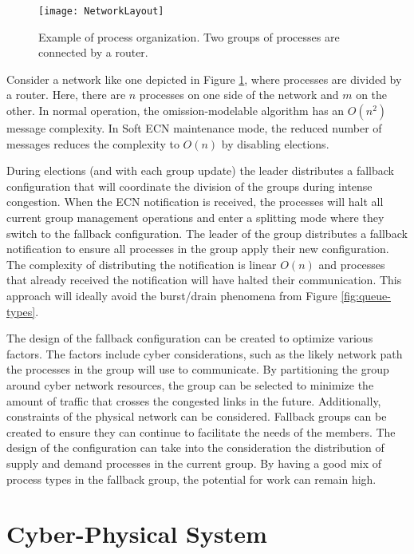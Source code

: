 \begin{figure}
\centering
\texttt{[image: NetworkLayout]}
\caption[Example of process organization]{Example of process organization. Two groups of processes are connected by a router.} \label{fig:network-layout}
\end{figure}

Consider a network like one depicted in Figure \ref{fig:network-layout}, where processes are divided by a router.
Here, there are $n$ processes on one side of the network and $m$ on the other.
In normal operation, the omission-modelable algorithm has an $O(n^2)$ message complexity.
In Soft \ac{ECN} maintenance mode, the reduced number of messages reduces the complexity to $O(n)$ by disabling elections.

During elections (and with each group update) the leader distributes a fallback configuration that will coordinate the division of the groups during intense congestion.
When the \ac{ECN} notification is received, the processes will halt all current group management operations and enter a splitting mode where they switch to the fallback configuration.
The leader of the group distributes a fallback notification to ensure all processes in the group apply their new configuration. 
The complexity of distributing the notification is linear $O(n)$ and processes that already received the notification will have halted their communication.
This approach will ideally avoid the burst/drain phenomena from Figure \ref{fig:queue-types}.

The design of the fallback configuration can be created to optimize various factors.
The factors include cyber considerations, such as the likely network path the processes in the group will use to communicate.
By partitioning the group around cyber network resources, the group can be selected to minimize the amount of traffic that crosses the congested links in the future.
Additionally, constraints of the physical network can be considered.
Fallback groups can be created to ensure they can continue to facilitate the needs of the members.
The design of the configuration can take into the consideration the distribution of supply and demand processes in the current group.
By having a good mix of process types in the fallback group, the potential for work can remain high.

\section{Cyber-Physical System}

